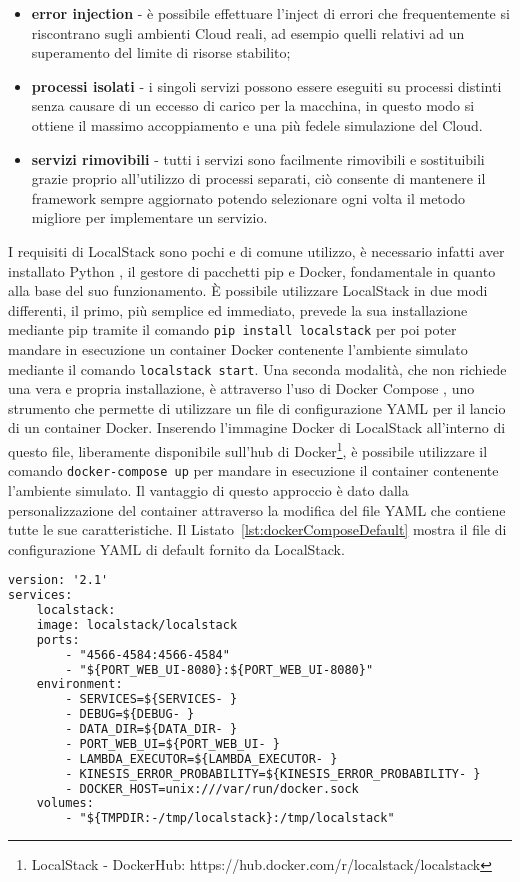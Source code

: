 \begin{itemize}
    \item \textbf{error injection} - è possibile effettuare l'inject di errori che frequentemente si riscontrano sugli ambienti Cloud reali, ad esempio quelli relativi ad un superamento del limite di risorse stabilito;
    \item \textbf{processi isolati} - i singoli servizi possono essere eseguiti su processi distinti senza causare di un eccesso di carico per la macchina, in questo modo si ottiene il massimo accoppiamento e una più fedele simulazione del Cloud.
    \item \textbf{servizi rimovibili} - tutti i servizi sono facilmente rimovibili e sostituibili grazie proprio all'utilizzo di processi separati, ciò consente di mantenere il framework sempre aggiornato potendo selezionare ogni volta il metodo migliore per implementare un servizio.
\end{itemize}

I requisiti di LocalStack sono pochi e di comune utilizzo, è necessario infatti aver installato Python \cite{PythonSite}, il gestore di pacchetti pip \cite{pip} e Docker, fondamentale in quanto alla base del suo funzionamento. È possibile utilizzare LocalStack in due modi differenti, il primo, più semplice ed immediato, prevede la sua installazione mediante pip tramite il comando \verb|pip install localstack| per poi poter mandare in esecuzione un container Docker contenente l’ambiente simulato mediante il comando \verb|localstack start|. Una seconda modalità, che non richiede una vera e propria installazione, è attraverso l’uso di Docker Compose \cite{dockerCompose}, uno strumento che permette di utilizzare un file di configurazione YAML per il lancio di un container Docker. Inserendo l'immagine Docker di LocalStack all'interno di questo file, liberamente disponibile sull’hub di Docker\footnote{LocalStack - DockerHub: https://hub.docker.com/r/localstack/localstack}, è possibile utilizzare il comando \verb|docker-compose up| per mandare in esecuzione il container contenente l'ambiente simulato. Il vantaggio di questo approccio è dato dalla personalizzazione del container attraverso la modifica del file YAML che contiene tutte le sue caratteristiche. Il Listato~\ref{lst:dockerComposeDefault} mostra il file di configurazione YAML di default fornito da LocalStack.\\

\begin{lstlisting}[language=XML, caption={File YAML di configurazione di default del docker container.}, label={lst:dockerComposeDefault}]
version: '2.1'
services:
    localstack:
    image: localstack/localstack
    ports:
        - "4566-4584:4566-4584"
        - "${PORT_WEB_UI-8080}:${PORT_WEB_UI-8080}"
    environment:
        - SERVICES=${SERVICES- }
        - DEBUG=${DEBUG- }
        - DATA_DIR=${DATA_DIR- }
        - PORT_WEB_UI=${PORT_WEB_UI- }
        - LAMBDA_EXECUTOR=${LAMBDA_EXECUTOR- }
        - KINESIS_ERROR_PROBABILITY=${KINESIS_ERROR_PROBABILITY- }
        - DOCKER_HOST=unix:///var/run/docker.sock
    volumes:
        - "${TMPDIR:-/tmp/localstack}:/tmp/localstack"
\end{lstlisting} 

